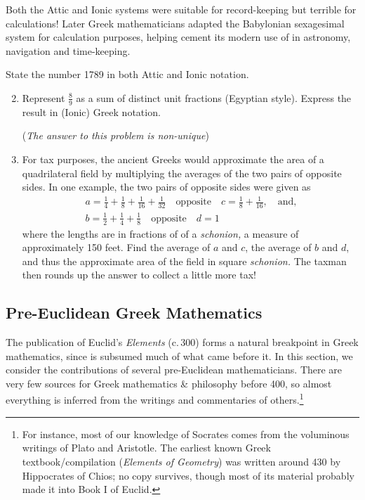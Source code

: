 Both the Attic and Ionic systems were suitable for record-keeping but terrible for calculations! Later Greek mathematicians adapted the Babylonian sexagesimal system for calculation purposes, helping cement its modern use of in astronomy, navigation and time-keeping.


\begin{exercises}{}{}
	\exstart State the number 1789 in both Attic and Ionic notation.
	\begin{enumerate}\setcounter{enumi}{1}
	  \item%
	  Represent $\frac 89$ as a sum of distinct unit fractions (Egyptian style). Express the result in (Ionic) Greek notation.\par
	  (\emph{The answer to this problem is non-unique})
	  
	  \item%
	  For tax purposes, the ancient Greeks would approximate the area of a quadrilateral field by multiplying the averages of the two pairs of opposite sides. In one example, the two pairs of opposite sides were given as
	  \begin{gather*}
	  a=\frac 14+\frac 18+\frac 1{16}+\frac 1{32}\quad\text{opposite}\quad c=\frac 18+\frac 1{16},\quad\text{and,}\\
	  b=\frac 12+\frac 14+\frac 18\quad\text{opposite}\quad d=1
	  \end{gather*}
	  where the lengths are in fractions of of a \emph{schonion,} a measure of approximately 150 feet. Find the average of $a$ and $c$, the average of $b$ and $d$, and thus the approximate area of the field in square \emph{schonion.} The taxman then rounds up the answer to collect a little more tax!
	\end{enumerate}
\end{exercises}

\clearpage



\subsection{Pre-Euclidean Greek Mathematics}

The publication of Euclid's \emph{Elements} (c.\,300\BC) forms a natural breakpoint in Greek mathematics, since is subsumed much of what came before it. In this section, we consider the contributions of several pre-Euclidean mathematicians. There are very few sources for Greek mathematics \& philosophy before 400\BC{}, so almost everything is inferred from the writings and commentaries of others.\footnote{%
	For instance, most of our knowledge of Socrates comes from the voluminous writings of Plato and Aristotle. The earliest known Greek textbook/compilation (\emph{Elements of Geometry}) was written around 430\BC{} by Hippocrates of Chios; no copy survives, though most of its material probably made it into Book I of Euclid.%
}

